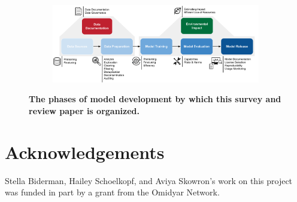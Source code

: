\documentclass{article}
\newcommand{\alon}[1]{\textcolor{cyan}{Alon: #1}}
\begin{document}
\begin{figure}[ht]
    \centering
    \begin{subfigure}{0.82\textwidth}
        \includegraphics[width=\textwidth]{logos/Overview2.pdf}
    \end{subfigure}
    \caption{\textbf{The phases of model development by which this survey and review paper is organized.}}
    \label{fig:cheatsheet-flow}
    \vspace{-6mm}
\end{figure}

\clearpage

\tableofcontents

\clearpage
















\section*{Acknowledgements}
Stella Biderman, Hailey Schoelkopf, and Aviya Skowron's work on this project was funded in part by a grant from the Omidyar Network.

\clearpage




\clearpage
\appendix






\end{document}
